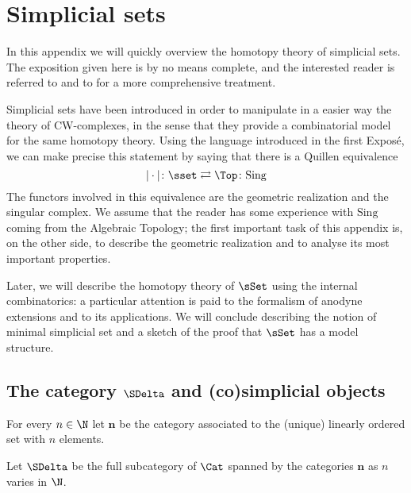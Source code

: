 \chapter{Simplicial sets}

\begin{refsection}

In this appendix we will quickly overview the homotopy theory of simplicial sets. The exposition given here is by no means complete, and the interested reader is referred to \cite{may} and to \cite[Chapter 1]{gj} for a more comprehensive treatment.

Simplicial sets have been introduced in order to manipulate in a easier way the theory of CW-complexes, in the sense that they provide a combinatorial model for the same homotopy theory. Using the language introduced in the first Expos\'e, we can make precise this statement by saying that there is a Quillen equivalence
\[
|\cdot| \colon \sset \rightleftarrows \Top \colon \mathrm{Sing}
\]
The functors involved in this equivalence are the geometric realization and the singular complex. We assume that the reader has some experience with $\mathrm{Sing}$ coming from the Algebraic Topology; the first important task of this appendix is, on the other side, to describe the geometric realization and to analyse its most important properties.

Later, we will describe the homotopy theory of $\sSet$ using the internal combinatorics: a particular attention is paid to the formalism of anodyne extensions and to its applications. We will conclude describing the notion of minimal simplicial set and a sketch of the proof that $\sSet$ has a model structure.

\section{The category \texorpdfstring{$\SDelta$}{\textbackslash Delta} and (co)simplicial objects}

\begin{notation}
For every $n \in \N$ let $\mathbf n$ be the category associated to the (unique) linearly ordered set with $n$ elements.
\end{notation}

\begin{defin}
Let $\SDelta$ be the full subcategory of $\Cat$ spanned by the categories $\mathbf n$ as $n$ varies in $\N$.
\end{defin}


\end{refsection}
